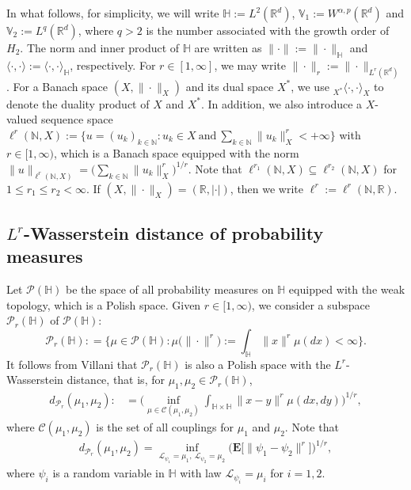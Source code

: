 \documentclass[11pt]{article}
\renewcommand{\leq}{\leqslant}
\numberwithin{equation}{section}
\begin{document}
In
what follows,
 for
  simplicity, we  will
   write $\mathbb{H}:=L^2(\mathbb{R}^d)$, $\mathbb{V}_1:=W^{\alpha,p}(\mathbb{R}^d)$  and  $\mathbb{V}_2:=L^q(\mathbb{R}^d)$, where $q>2$
is the number associated with the growth order of $H_2$. The norm and inner product of $\mathbb{H}$ are
written as $\|\cdot\|:=\|\cdot\|_{\mathbb{H}}$
and $\langle \cdot,\cdot\rangle:=\langle \cdot ,\cdot\rangle_{\mathbb{H}}$, respectively. For $r\in[1,\infty]$, we may write $\|\cdot\|_r:=\|\cdot\|_{L^r(\mathbb{R}^d)}$.
For a Banach space $(X,\|\cdot\|_{X})$ and its dual space $X^*$, we use $_{X^*}\langle \cdot,
\cdot\rangle_{X}$ to denote the
duality product of $X$ and $X^*$. In addition, we also introduce a $X$-valued sequence space   $\ell^r(\mathbb{N},X):=\big\{u=(u_k)_{k\in \mathbb{N}} : u_k\in X\ \mbox{and}\ \sum_{k\in \mathbb{N}}\|u_k\|_X^r<+\infty\big\}$ with $r\in[1,\infty)$, which is a Banach space equipped with the norm $\|u\|_{\ell^r(\mathbb{N},X)}
=\big(\sum_{k\in \mathbb{N}}\|u_k\|_X^r\big)^{1/r}$.
Note that $\ell^{r_1}(\mathbb{N},X)\subseteq
\ell^{r_2}(\mathbb{N},X)$ for $1\leq r_1\leq r_2<\infty$. If $(X,\|\cdot\|_{X})=
(\mathbb{R},|\cdot|)$,
then we  write $\ell^r:=\ell^r(\mathbb{N},\mathbb{R})$.




\subsection{$L^r$-Wasserstein distance of probability measures}
Let $\mathcal{P}(\mathbb{H})$ be the space of all probability measures on $\mathbb{H}$ equipped with the weak topology,
which is
a
Polish space.
Given $r\in[1,\infty)$, we consider a subspace $\mathcal{P}_r(\mathbb{H})$ of $\mathcal{P}(\mathbb{H})$:
$$\mathcal{P}_r(\mathbb{H}):
=\Bigg\{ \mu\in  \mathcal{P}(\mathbb{H}):  \mu\big(\|\cdot\|^r\big)
:=\int_{\mathbb{H}}\|x\|^r\mu(dx) <\infty \Bigg\}.$$
It follows from Villani \cite[Definition 6.1]{Villani} that $\mathcal{P}_r(\mathbb{H})$ is also a
 Polish space with the $L^r$-Wasserstein distance, that is, for $\mu_1,\mu_2\in\mathcal{P}_r(\mathbb{H})$,
 \begin{align}\label{Wasserstein}
 d_{\mathcal{P}_r}
 (\mu_1,\mu_2):&=\Bigg(
 \inf_{\mu\in \mathcal{C}(\mu_1,\mu_2)}
 \int_{\mathbb{H}\times\mathbb{H}}\|x-y
 \|^r\mu(dx,dy)\Bigg)^{1/r},
\end{align}
where $\mathcal{C}(\mu_1,\mu_2)$ is
the set of all couplings for  $\mu_1$ and $\mu_2$.
Note  that
 \begin{align}\label{Wassersteinaa}
 d_{\mathcal{P}_r}
 (\mu_1,\mu_2)
= \inf_{\mathcal{L}_{\psi_1}=\mu_1,\        \mathcal{L}_{\psi_2}=\mu_2}
\Big(\mathbf{E}\big[\|\psi_1-
\psi_2\|^r\big]\Big)^{1/r},
\end{align}
where $\psi_i$ is a random variable
in
$\mathbb{H}$
with law
$\mathcal{L}_{\psi_i}=\mu_i$ for $i=1,2$.
\end{document}
